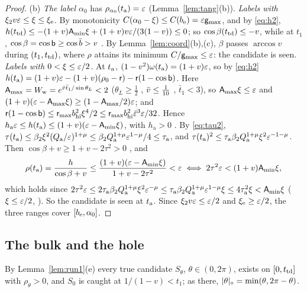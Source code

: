 \begin{proof}
(b) \emph{The label $\alpha_0$} has $\rho_{\alpha_0}(t_{\mathrm a})=\varepsilon$ (Lemma~\ref{lem:tang}(b)). \emph{Labels with $\xi_2v\varepsilon\le\xi\le\xi_{\mathrm e}$.}
By monotonicity $C(\alpha_0-\xi)\le C(b_{\mathrm e})=\varepsilon\mathsf g_{\max}$, and by \eqref{eq:h2}, $h(t_{\mathrm{td}})\le-(1+v)\mathsf A_{\min}\xi+(1+v)v\varepsilon/(3(1-v))\le0$;
so $\cos\beta(t_{\mathrm{td}})\le-v$, while at $t_1$, $\cos\beta=\cos\mathsf b\ge\cos\bar b>v$ . By Lemma~\ref{lem:coord}(b),(c), $\beta$
passes $\arccos v$ during $(t_1,t_{\mathrm{td}})$, where $\rho$ attains its minimum $C/\mathsf g_{\max}\le\varepsilon$: the candidate is seen.
\emph{Labels with $0<\xi\le\varepsilon/2$.} At $t_{\mathrm a}$, $(1-v^2)\omega(t_{\mathrm a})=(1+v)\varepsilon$, so by \eqref{eq:h2}
$h(t_{\mathrm a})=(1+v)\varepsilon-(1+v)(\rho_0-\mathsf r)-\mathsf r(1-\cos\mathsf b)$. Here $\mathsf A_{\max}=W_{\mathrm w}=e^{\bar v\bar t_1/\sin\theta_L}<2$ ($\theta_L\ge\frac12$
, $\bar v\le\frac1{10}$ , $\bar t_1<3$), so $\mathsf A_{\max}\xi\le\varepsilon$ and
$(1+v)(\varepsilon-\mathsf A_{\max}\xi)\ge(1-\mathsf A_{\max}/2)\varepsilon$; and $\mathsf r(1-\cos\mathsf b)\le\mathsf r_{\max}b_{\mathrm{hi}}^2\xi^4/2\le
\mathsf r_{\max}b_{\mathrm{hi}}^2\bar\varepsilon^3\varepsilon/32$. Hence $h_{\mathrm a}\varepsilon\le h(t_{\mathrm a})\le(1+v)(\varepsilon-\mathsf A_{\min}\xi)$, with $h_{\mathrm a}>0$
. By \eqref{eq:tau2}, $\tau(t_{\mathrm a})\le\beta_2\xi^2(Q_{\mathrm a}/\varepsilon)^{1+\mu}\le\beta_2Q_{\mathrm a}^{1+\mu}\varepsilon^{1-\mu}/4\le
\tau_{\mathrm a}$, and $\tau(t_{\mathrm a})^2\le\tau_{\mathrm a}\beta_2Q_{\mathrm a}^{1+\mu}\xi^2\varepsilon^{-1-\mu}$. Then
$\cos\beta+v\ge1+v-2\tau^2>0$ , and
\[
\rho(t_{\mathrm a})=\frac h{\cos\beta+v}\le\frac{(1+v)(\varepsilon-\mathsf A_{\min}\xi)}{1+v-2\tau^2}<\varepsilon
\iff2\tau^2\varepsilon<(1+v)\mathsf A_{\min}\xi ,
\]
which holds since $2\tau^2\varepsilon\le2\tau_{\mathrm a}\beta_2Q_{\mathrm a}^{1+\mu}\xi^2\varepsilon^{-\mu}\le\tau_{\mathrm a}\beta_2Q_{\mathrm a}^{1+\mu}
\varepsilon^{1-\mu}\xi\le4\tau_{\mathrm a}^2\xi<\mathsf A_{\min}\xi$ ($\xi\le\varepsilon/2$, ). So the candidate is seen at $t_{\mathrm a}$. Since
$\xi_2v\varepsilon\le\varepsilon/2$  and $\xi_{\mathrm e}\ge\varepsilon/2$, the three ranges cover $[b_{\mathrm e},\alpha_0]$.
\end{proof}

\subsection{The bulk and the hole}\label{sec:bulk}

By Lemma~\ref{lem:run1}(e) every true candidate $S_\theta$, $\theta\in(0,2\pi)$, exists on $[0,t_{\mathrm{td}}]$ with $\rho_\theta>0$, and
$S_0$ is caught at $1/(1-v)<t_1$; as there, $|\theta|_\circ=\min(\theta,2\pi-\theta)$.

